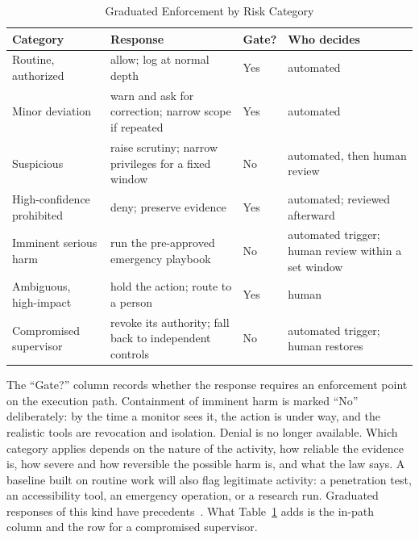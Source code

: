 \documentclass{ieeeaccess}
\begin{document}
\begin{table}[!t]
\caption{Graduated Enforcement by Risk Category}
\label{tab:enforcement}
\centering
\footnotesize
\setlength{\tabcolsep}{3pt}
\begin{tabular}{>{\raggedright\arraybackslash}p{1.75cm}>{\raggedright\arraybackslash}p{2.3cm}>{\raggedright\arraybackslash}p{0.8cm}>{\raggedright\arraybackslash}p{2.05cm}}
\toprule
\rowcolor{darkblue!15}
\textbf{Category} & \textbf{Response} & \textbf{Gate?} & \textbf{Who decides} \\
\midrule
Routine, authorized & allow; log at normal depth & Yes & automated \\
\rowcolor{darkblue!5}
Minor deviation & warn and ask for correction; narrow scope if repeated & Yes & automated \\
Suspicious & raise scrutiny; narrow privileges for a fixed window & No & automated, then human review \\
\rowcolor{darkblue!5}
High-confidence prohibited & deny; preserve evidence & Yes & automated; reviewed afterward \\
Imminent serious harm & run the pre-approved emergency playbook & No & automated trigger; human review within a set window \\
\rowcolor{darkblue!5}
Ambiguous, high-impact & hold the action; route to a person & Yes & human \\
Compromised supervisor & revoke its authority; fall back to independent controls & No & automated trigger; human restores \\
\bottomrule
\end{tabular}
\end{table}

The ``Gate?'' column records whether the response requires an enforcement point on the execution path. Containment of imminent harm is marked ``No'' deliberately: by the time a monitor sees it, the action is under way, and the realistic tools are revocation and isolation. Denial is no longer available. Which category applies depends on the nature of the activity, how reliable the evidence is, how severe and how reversible the possible harm is, and what the law says. A baseline built on routine work will also flag legitimate activity: a penetration test, an accessibility tool, an emergency operation, or a research run. Graduated responses of this kind have precedents~\cite{gaurav2025gaas,wang2025mi9}.
What Table~\ref{tab:enforcement} adds is the in-path column and the row for a compromised supervisor.
\end{document}
